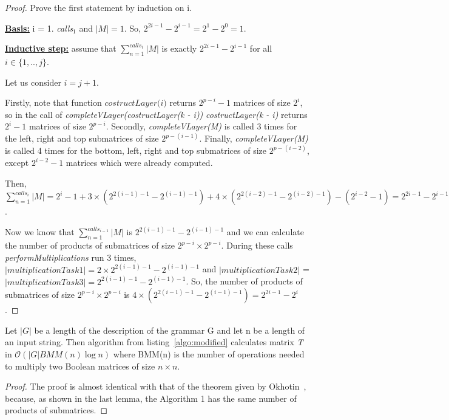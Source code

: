 \begin{proof}

Prove the first statement by induction on i.

\underline{\textbf{Basis:}} i = 1. \textit{calls$_{1}$} and $|M| = 1$. So, $2^{2i - 1} - 2^{i - 1} = 2^1 - 2^0 = 1$.

\underline{\textbf{Inductive step:}} assume that $\sum_{n=1}^{calls_i}{|M|}$ is exactly $2^{2i - 1} - 2^{i - 1}$ for all $i \in \{ 1, .., j\}$.

Let us consider $i = j + 1$.

Firstly, note that function $\textit{costructLayer(i)}$ returns $2^{p - i} - 1$ matrices of size $2^i$, so in the call of \textit{completeVLayer(costructLayer(k - i))}  \textit{costructLayer(k - i)} returns $2^i - 1$ matrices of size $2^{p - i}$. 
Secondly, \textit{completeVLayer(M)} is called 3 times for the left, right and top submatrices of size $2^{p - (i - 1)}$. Finally, \textit{completeVLayer(M)} is called 4 times for the bottom, left, right and top submatrices of size $2^{p - (i - 2)}$, except $2^{i - 2} - 1$ matrices which were already computed.

Then, $\sum_{n=1}^{calls_i}{|M|} = 2^{i} - 1 + 3 \times (2^{2(i - 1) - 1} - 2^{(i - 1) - 1}) + 4 \times (2^{2(i - 2) - 1} - 2^{(i - 2) - 1}) - (2^{i - 2} - 1) = 2^{2i - 1} - 2^{i - 1}$.

Now we know that $\sum_{n=1}^{calls_{i-1}}{|M|}$  is $2^{2(i - 1) - 1} - 2^{(i - 1) - 1}$ and we can calculate the number of products of submatrices of size $2^{p - i} \times 2^{p - i}$. 
During these calls \textit{performMultiplications} run 3 times, $|multiplicationTask1| = 2 \times 2^{2(i - 1) - 1} - 2^{(i - 1) - 1}$ and $|multiplicationTask2|$ = $|multiplicationTask3| = 2^{2(i - 1) - 1} - 2^{(i - 1) - 1}$. So, the number of products of submatrices of size $2^{p - i} \times 2^{p - i}$ is $ 4 \times (2^{2(i - 1) - 1} - 2^{(i - 1) - 1}) = 2^{2i - 1} - 2^{i}$.
\end{proof}

\begin{theorem}
Let $|G|$ be a length of the description of the grammar G and let n be a length of an input string. Then algorithm from listing~\ref{algo:modified} calculates matrix \textit{T} in $\mathcal{O}(|G|BMM(n)\log{n})$ where BMM(n) is the number of operations needed to multiply two Boolean matrices of size $n \times n$.
\end{theorem}

\begin{proof}
The proof is almost identical with that of the theorem given by Okhotin~\cite{Okhotin:2014:PMM:2565359.2565379}, because, as shown in the last lemma, the Algorithm 1 has the same number of products of submatrices.
\end{proof}

